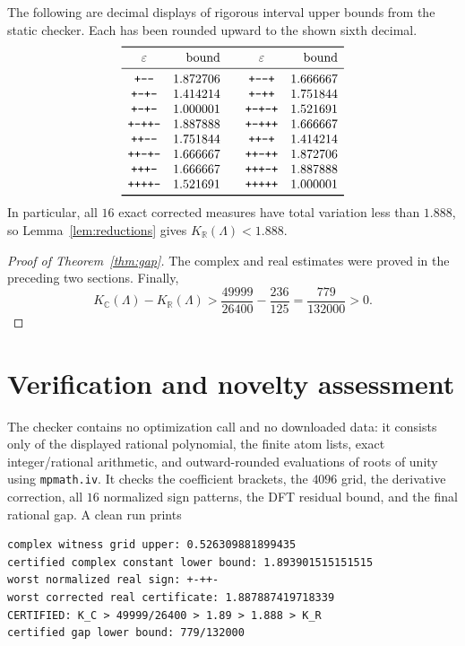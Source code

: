\documentclass[11pt]{article}
\theoremstyle{remark}
\newcommand{\KR}{K_{\mathbb R}}
\newcommand{\KC}{K_{\mathbb C}}
\begin{document}
The following are decimal displays of rigorous interval upper bounds from the
static checker.  Each has been rounded upward to the shown sixth decimal.
\[
\begin{array}{c r@{\qquad}c r}
\toprule
\varepsilon&\text{bound}&\varepsilon&\text{bound}\\
\midrule
\texttt{+----}&1.872706&\texttt{+---+}&1.666667\\
\texttt{+--+-}&1.414214&\texttt{+--++}&1.751844\\
\texttt{+-+--}&1.000001&\texttt{+-+-+}&1.521691\\
\texttt{+-++-}&1.887888&\texttt{+-+++}&1.666667\\
\texttt{++---}&1.751844&\texttt{++--+}&1.414214\\
\texttt{++-+-}&1.666667&\texttt{++-++}&1.872706\\
\texttt{+++--}&1.666667&\texttt{+++-+}&1.887888\\
\texttt{++++-}&1.521691&\texttt{+++++}&1.000001\\
\bottomrule
\end{array}
\]
In particular, all $16$ exact corrected measures have total variation less
than $1.888$, so Lemma~\ref{lem:reductions} gives $\KR(\Lambda)<1.888$.

\begin{proof}[Proof of Theorem~\ref{thm:gap}]
The complex and real estimates were proved in the preceding two sections.
Finally,
\[
 \KC(\Lambda)-\KR(\Lambda)
 >\frac{49999}{26400}-\frac{236}{125}
 =\frac{779}{132000}>0.
\]
\end{proof}

\section{Verification and novelty assessment}

The checker contains no optimization call and no downloaded data: it consists
only of the displayed rational polynomial, the finite atom lists, exact
integer/rational arithmetic, and outward-rounded evaluations of roots of
unity using \texttt{mpmath.iv}.  It checks the coefficient brackets, the
$4096$ grid, the derivative correction, all $16$ normalized sign patterns,
the DFT residual bound, and the final rational gap.  A clean run prints
\begin{verbatim}
complex witness grid upper: 0.526309881899435
certified complex constant lower bound: 1.893901515151515
worst normalized real sign: +-++-
worst corrected real certificate: 1.887887419718339
CERTIFIED: K_C > 49999/26400 > 1.89 > 1.888 > K_R
certified gap lower bound: 779/132000
\end{verbatim}
\end{document}
